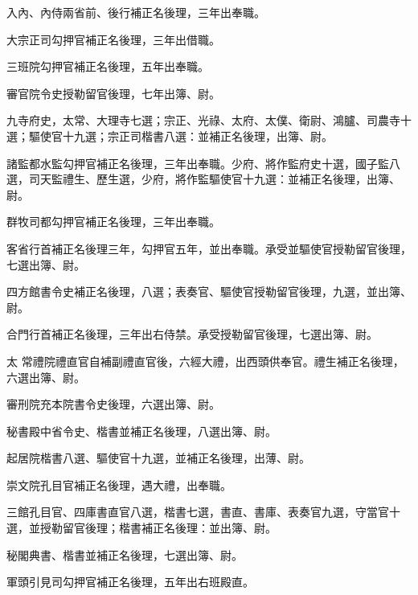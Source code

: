 \begin{pinyinscope}
 入內、內侍兩省前、後行補正名後理，三年出奉職。



 大宗正司勾押官補正名後理，三年出借職。



 三班院勾押官補正名後理，五年出奉職。



 審官院令史授勒留官後理，七年出簿、尉。



 九寺府史，太常、大理寺七選；宗正、光祿、太府、太僕、衛尉、鴻臚、司農寺十選；驅使官十九選；宗正司楷書八選：並補正名後理，出簿、尉。



 諸監都水監勾押官補正名後理，三年出奉職。少府、將作監府史十選，國子監八選，司天監禮生、歷生選，少府，將作監驅使官十九選：並補正名後理，出簿、尉。



 群牧司都勾押官補正名後理，三年出奉職。



 客省行首補正名後理三年，勾押官五年，並出奉職。承受並驅使官授勒留官後理，七選出簿、尉。



 四方館書令史補正名後理，八選；表奏官、驅使官授勒留官後理，九選，並出簿、尉。



 合門行首補正名後理，三年出右侍禁。承受授勒留官後理，七選出簿、尉。



 太
 常禮院禮直官自補副禮直官後，六經大禮，出西頭供奉官。禮生補正名後理，六選出簿、尉。



 審刑院充本院書令史後理，六選出簿、尉。



 秘書殿中省令史、楷書並補正名後理，八選出簿、尉。



 起居院楷書八選、驅使官十九選，並補正名後理，出薄、尉。



 崇文院孔目官補正名後理，遇大禮，出奉職。



 三館孔目官、四庫書直官八選，楷書七選，書直、書庫、表奏官九選，守當官十選，並授勒留官後理；楷書補正名後理：並出簿、尉。



 秘閣典書、楷書並補正名後理，七選出簿、尉。



 軍頭引見司勾押官補正名後理，五年出右班殿直。




\end{pinyinscope}
